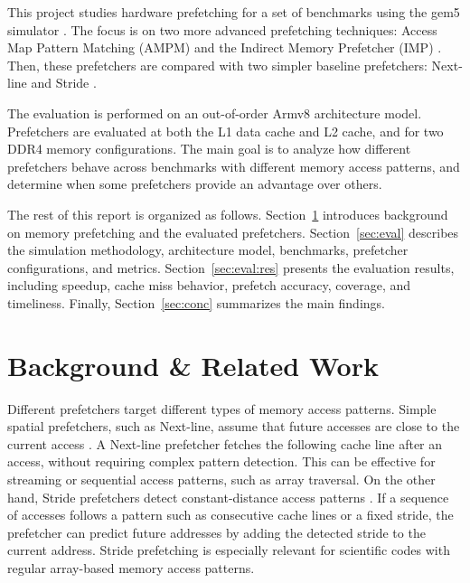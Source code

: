 \documentclass[12pt, letterpaper]{article}
\begin{document}
\noindent This project studies hardware prefetching for a set of benchmarks using the gem5 simulator \cite{binkert-gem5-11}. The focus is on two more advanced prefetching techniques: Access Map Pattern Matching (AMPM) \cite{ishii-jilp-11} and the Indirect Memory Prefetcher (IMP) \cite{yu-micro-15}. Then, these prefetchers are compared with two simpler baseline prefetchers: Next-line \cite{smith-cache-82} and Stride \cite{chen-baer-95}.

\noindent The evaluation is performed on an out-of-order Armv8 architecture model. Prefetchers are evaluated at both the L1 data cache and L2 cache, and for two DDR4 memory configurations. The main goal is to analyze how different prefetchers behave across benchmarks with different memory access patterns, and determine when some prefetchers provide an advantage over others.

\noindent The rest of this report is organized as follows. Section~\ref{sec:back} introduces background on memory prefetching and the evaluated prefetchers. Section~\ref{sec:eval} describes the simulation methodology, architecture model, benchmarks, prefetcher configurations, and metrics. Section~\ref{sec:eval:res} presents the evaluation results, including speedup, cache miss behavior, prefetch accuracy, coverage, and timeliness. Finally, Section~\ref{sec:conc} summarizes the main findings.

\FloatBarrier
\section{Background \& Related Work}
\label{sec:back}


\noindent Different prefetchers target different types of memory access patterns. Simple spatial prefetchers, such as Next-line, assume that future accesses are close to the current access \cite{smith-cache-82}. A Next-line prefetcher fetches the following cache line after an access, without requiring complex pattern detection. This can be effective for streaming or sequential access patterns, such as array traversal. On the other hand, Stride prefetchers detect constant-distance access patterns \cite{chen-baer-95}. If a sequence of accesses follows a pattern such as consecutive cache lines or a fixed stride, the prefetcher can predict future addresses by adding the detected stride to the current address. Stride prefetching is especially relevant for scientific codes with regular array-based memory access patterns.
\end{document}
